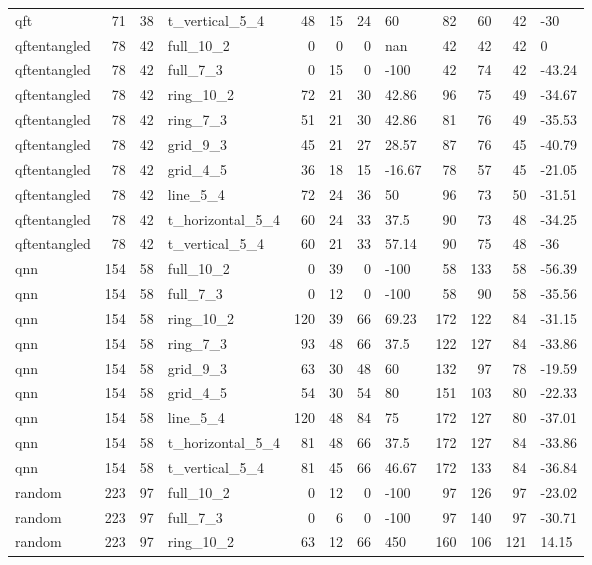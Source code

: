 \begin{longtable}{lrrlrrrlrrrl}
qft & 71 & 38 & t\_vertical\_5\_4 & 48 & 15 & 24 & 60 & 82 & 60 & 42 & -30 \\
qftentangled & 78 & 42 & full\_10\_2 & 0 & 0 & 0 & nan & 42 & 42 & 42 & 0 \\
qftentangled & 78 & 42 & full\_7\_3 & 0 & 15 & 0 & -100 & 42 & 74 & 42 & -43.24 \\
qftentangled & 78 & 42 & ring\_10\_2 & 72 & 21 & 30 & 42.86 & 96 & 75 & 49 & -34.67 \\
qftentangled & 78 & 42 & ring\_7\_3 & 51 & 21 & 30 & 42.86 & 81 & 76 & 49 & -35.53 \\
qftentangled & 78 & 42 & grid\_9\_3 & 45 & 21 & 27 & 28.57 & 87 & 76 & 45 & -40.79 \\
qftentangled & 78 & 42 & grid\_4\_5 & 36 & 18 & 15 & -16.67 & 78 & 57 & 45 & -21.05 \\
qftentangled & 78 & 42 & line\_5\_4 & 72 & 24 & 36 & 50 & 96 & 73 & 50 & -31.51 \\
qftentangled & 78 & 42 & t\_horizontal\_5\_4 & 60 & 24 & 33 & 37.5 & 90 & 73 & 48 & -34.25 \\
qftentangled & 78 & 42 & t\_vertical\_5\_4 & 60 & 21 & 33 & 57.14 & 90 & 75 & 48 & -36 \\
qnn & 154 & 58 & full\_10\_2 & 0 & 39 & 0 & -100 & 58 & 133 & 58 & -56.39 \\
qnn & 154 & 58 & full\_7\_3 & 0 & 12 & 0 & -100 & 58 & 90 & 58 & -35.56 \\
qnn & 154 & 58 & ring\_10\_2 & 120 & 39 & 66 & 69.23 & 172 & 122 & 84 & -31.15 \\
qnn & 154 & 58 & ring\_7\_3 & 93 & 48 & 66 & 37.5 & 122 & 127 & 84 & -33.86 \\
qnn & 154 & 58 & grid\_9\_3 & 63 & 30 & 48 & 60 & 132 & 97 & 78 & -19.59 \\
qnn & 154 & 58 & grid\_4\_5 & 54 & 30 & 54 & 80 & 151 & 103 & 80 & -22.33 \\
qnn & 154 & 58 & line\_5\_4 & 120 & 48 & 84 & 75 & 172 & 127 & 80 & -37.01 \\
qnn & 154 & 58 & t\_horizontal\_5\_4 & 81 & 48 & 66 & 37.5 & 172 & 127 & 84 & -33.86 \\
qnn & 154 & 58 & t\_vertical\_5\_4 & 81 & 45 & 66 & 46.67 & 172 & 133 & 84 & -36.84 \\
random & 223 & 97 & full\_10\_2 & 0 & 12 & 0 & -100 & 97 & 126 & 97 & -23.02 \\
random & 223 & 97 & full\_7\_3 & 0 & 6 & 0 & -100 & 97 & 140 & 97 & -30.71 \\
random & 223 & 97 & ring\_10\_2 & 63 & 12 & 66 & 450 & 160 & 106 & 121 & 14.15 \\

\end{longtable}
